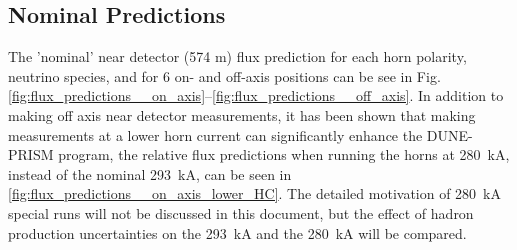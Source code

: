 \documentclass{article}
\begin{document}
\subsection{Nominal Predictions}

The 'nominal' near detector (574 m) flux prediction for each horn polarity, neutrino species, and for 6 on- and off-axis positions can be see in Fig.\ref{fig:flux_predictions__on_axis}--\ref{fig:flux_predictions__off_axis}. In addition to making off axis near detector measurements, it has been shown that making measurements at a lower horn current can significantly enhance the DUNE-PRISM program, the relative flux predictions when running the horns at 280~kA, instead of the nominal 293~kA, can be seen in \ref{fig:flux_predictions__on_axis_lower_HC}. The detailed motivation of 280~kA special runs will not be discussed in this document, but the effect of hadron production uncertainties on the 293~kA and the 280~kA will be compared.
\end{document}
